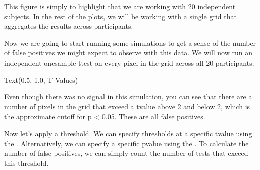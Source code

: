\documentclass[letterpaper,10pt,english]{sphinxmanual}
\begin{document}
This figure is simply to highlight that we are working with 20 independent subjects. In the rest of the plots, we will be working with a single grid that aggregates the results across participants.

Now we are going to start running some simulations to get a sense of the number of false positives we might expect to observe with this data. We will now run an independent one\sphinxhyphen{}sample t\sphinxhyphen{}test on every pixel in the grid across all 20 participants.

\begin{sphinxVerbatim}[commandchars=\\\{\}]

    
 
\end{sphinxVerbatim}

\begin{sphinxVerbatim}[commandchars=\\\{\}]
Text(0.5, 1.0, \PYGZsq{}T Values\PYGZsq{})
\end{sphinxVerbatim}

\noindent{}

Even though there was no signal in this simulation, you can see that there are a number of pixels in the grid that exceed a t\sphinxhyphen{}value above 2 and below \sphinxhyphen{}2, which is the approximate cutoff for p \textless{} 0.05. These are all false positives.

Now let’s apply a threshold. We can specify thresholds at a specific t\sphinxhyphen{}value using the . Alternatively, we can specify a specific p\sphinxhyphen{}value using the . To calculate the number of false positives, we can simply count the number of tests that exceed this threshold.
\end{document}
